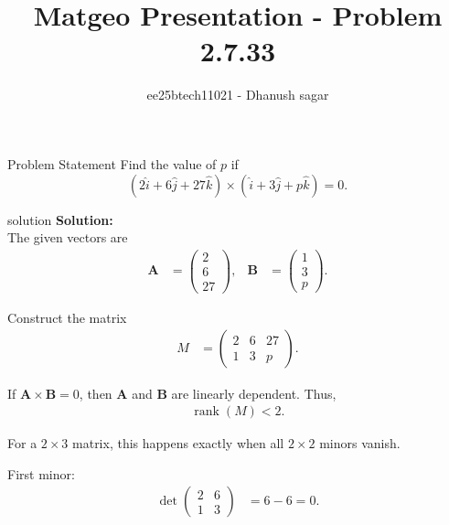 \documentclass{beamer}
\title{Matgeo Presentation - Problem 2.7.33}
\author{ee25btech11021 - Dhanush sagar}
\numberwithin{equation}{section}
\theoremstyle{remark}
\newcommand{\myvec}[1]{\ensuremath{\begin{pmatrix}#1\end{pmatrix}}}
\let\vec\mathbf
\begin{document}
	

		




\begin{frame}
  \titlepage
\end{frame}

\begin{frame}{Problem Statement}
   Find the value of $p$ if
\[
(2\hat{i} + 6\hat{j} + 27\hat{k}) \times (\hat{i} + 3\hat{j} + p\hat{k}) = 0.
\]
\end{frame}

\begin{frame}{solution}
 \textbf{Solution:} \\
The given vectors are
\begin{align}
\vec{A} &= \myvec{2 \\ 6 \\ 27}, 
& \vec{B} &= \myvec{1 \\ 3 \\ p}.
\end{align}

Construct the matrix
\begin{align}
M &= \myvec{2 & 6 & 27 \\ 1 & 3 & p}.
\end{align}

If $\vec{A} \times \vec{B} = 0$, then $\vec{A}$ and $\vec{B}$ are linearly dependent. 
Thus,
\begin{align}
\operatorname{rank}(M) < 2.
\end{align}

For a $2 \times 3$ matrix, this happens exactly when all $2 \times 2$ minors vanish.

First minor:
\begin{align}
\det\myvec{2 & 6 \\ 1 & 3} &= 6 - 6 = 0.
\end{align}
\end{frame}
\end{document}
